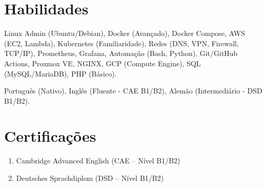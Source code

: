 \documentclass[11pt]{article} %
\begin{document}
\section{Habilidades}
\begin{description}[itemsep=0pt, leftmargin=*, style=unboxed]
	\item[Técnicas] Linux Admin (Ubuntu/Debian), Docker (Avançado), Docker Compose, AWS (EC2, Lambda), Kubernetes (Familiaridade), Redes (DNS, VPN, Firewall, TCP/IP), Prometheus, Grafana, Automação (Bash, Python), Git/GitHub Actions, Proxmox VE, NGINX, GCP (Compute Engine), SQL (MySQL/MariaDB), PHP (Básico). %
    \item[Idiomas] Português (Nativo), Inglês (Fluente - CAE B1/B2), Alemão (Intermediário - DSD B1/B2).
\end{description}

\section{Certificações}
\begin{enumerate}[label=\null, left=0pt .. \parindent, itemsep=0pt]
	\item Cambridge Advanced English (CAE -- Nível B1/B2)
	\item Deutsches Sprachdiplom (DSD -- Nível B1/B2)
\end{enumerate}
\end{document}
